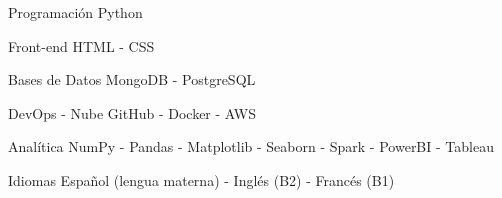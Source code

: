 


\begin{cvskills}


\cvskill
{Programación} %
{Python} %


\cvskill
{Front-end} %
{HTML - CSS} %


\cvskill
{Bases de Datos} %
{MongoDB - PostgreSQL} %


\cvskill
{DevOps - Nube} %
{GitHub - Docker - AWS} %


\cvskill
{Analítica} %
{NumPy - Pandas - Matplotlib - Seaborn - Spark - PowerBI - Tableau} %


\cvskill
{Idiomas} %
{Español (lengua materna) - Inglés (B2) - Francés (B1)} %


\end{cvskills}